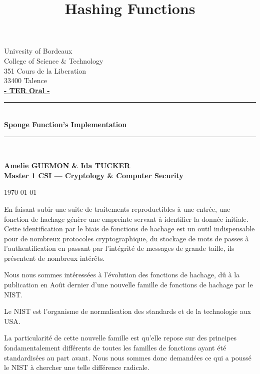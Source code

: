 \documentclass[10.5pt, a4paper, twoside, openright]{report}
\title{Hashing Functions}
\author{}
\newcommand{\HRule}{\rule{\linewidth}{0.5mm}}
\begin{document}
\begin{titlepage}
  \begin{sffamily}
  \begin{center}

    Univesity of Bordeaux\\College of Science \& Technology\\
           351 Cours de la Liberation\\33400 Talence\\[1em]
            \textbf{\underline{- TER Oral -}}\\[1.5cm]


    \HRule\\[0.3cm]
    { \huge \bfseries Sponge Function's Implementation\\[0.5cm] }
    \HRule\\
    \begin{flushright}
      \bfseries {Amelie GUEMON \& Ida TUCKER\\[1em]Master 1 CSI --- Cryptology \& Computer Security}\\[6.6cm]
    \end{flushright}
    
   
    \today

  \end{center}
  \end{sffamily}
\end{titlepage}
En faisant subir une suite de traitements reproductibles à une entrée, une fonction de hachage génère une empreinte servant à identifier la donnée initiale. Cette identification par le biais de fonctions de hachage est un outil indispensable pour de nombreux protocoles cryptographique, du stockage de mots de passes à l’authentification en passant par l’intégrité de messages de grande taille, ils présentent de nombreux intérêts. 

Nous nous sommes intéressées à l’évolution des fonctions de hachage, dû à la publication en Août dernier d’une nouvelle famille de fonctions de hachage par le NIST.

Le NIST est l’organisme de normalisation des standards et de la technologie aux USA.

La particularité de cette nouvelle famille est qu’elle repose sur des principes fondamentalement différents de toutes les familles de fonctions ayant été standardisées au part avant. Nous nous sommes donc demandées ce qui a poussé le NIST à chercher une telle différence radicale.
\end{document}
